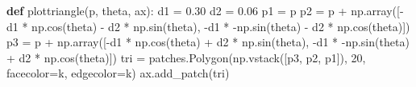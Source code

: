 \documentclass[
]{article}
\newenvironment{Shaded}{\begin{snugshade}}{\end{snugshade}}
\newcommand{\DecValTok}[1]{\textcolor[rgb]{0.68,0.00,0.00}{#1}}
\newcommand{\FloatTok}[1]{\textcolor[rgb]{0.68,0.00,0.00}{#1}}
\newcommand{\KeywordTok}[1]{\textcolor[rgb]{0.00,0.23,0.31}{\textbf{#1}}}
\newcommand{\NormalTok}[1]{\textcolor[rgb]{0.00,0.23,0.31}{#1}}
\newcommand{\OperatorTok}[1]{\textcolor[rgb]{0.37,0.37,0.37}{#1}}
\newcommand{\StringTok}[1]{\textcolor[rgb]{0.13,0.47,0.30}{#1}}
\begin{document}
\begin{Shaded}
\begin{Highlighting}[]
\KeywordTok{def}\NormalTok{ plottriangle(p, theta, ax):}
\NormalTok{    d1 }\OperatorTok{=} \FloatTok{0.30}
\NormalTok{    d2 }\OperatorTok{=} \FloatTok{0.06}
\NormalTok{    p1 }\OperatorTok{=}\NormalTok{ p}
\NormalTok{    p2 }\OperatorTok{=}\NormalTok{ p }\OperatorTok{+}\NormalTok{ np.array([}\OperatorTok{{-}}\NormalTok{d1 }\OperatorTok{*}\NormalTok{ np.cos(theta) }\OperatorTok{{-}}\NormalTok{ d2 }\OperatorTok{*}\NormalTok{ np.sin(theta), }
                       \OperatorTok{{-}}\NormalTok{d1 }\OperatorTok{*} \OperatorTok{{-}}\NormalTok{np.sin(theta) }\OperatorTok{{-}}\NormalTok{ d2 }\OperatorTok{*}\NormalTok{ np.cos(theta)])}
\NormalTok{    p3 }\OperatorTok{=}\NormalTok{ p }\OperatorTok{+}\NormalTok{ np.array([}\OperatorTok{{-}}\NormalTok{d1 }\OperatorTok{*}\NormalTok{ np.cos(theta) }\OperatorTok{+}\NormalTok{ d2 }\OperatorTok{*}\NormalTok{ np.sin(theta), }
                       \OperatorTok{{-}}\NormalTok{d1 }\OperatorTok{*} \OperatorTok{{-}}\NormalTok{np.sin(theta) }\OperatorTok{+}\NormalTok{ d2 }\OperatorTok{*}\NormalTok{ np.cos(theta)])}
\NormalTok{    tri }\OperatorTok{=}\NormalTok{ patches.Polygon(np.vstack([p3, p2, p1]), }\DecValTok{20}\NormalTok{, facecolor}\OperatorTok{=}\StringTok{\textquotesingle{}k\textquotesingle{}}\NormalTok{, edgecolor}\OperatorTok{=}\StringTok{\textquotesingle{}k\textquotesingle{}}\NormalTok{)}
\NormalTok{    ax.add\_patch(tri)}
\end{Highlighting}
\end{Shaded}
\end{document}
